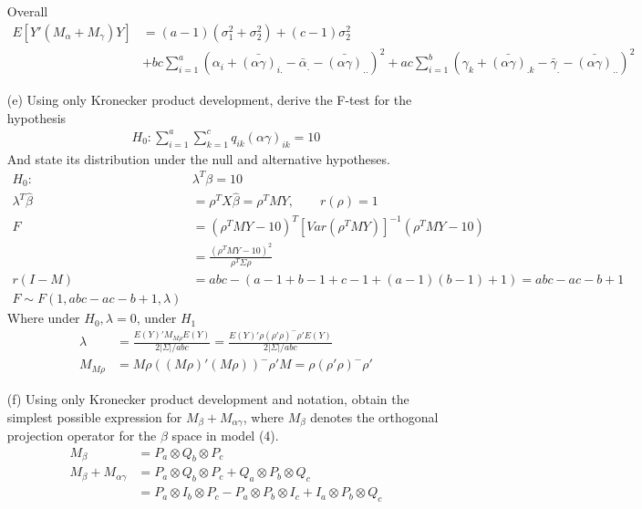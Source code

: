 \begin{itemize}
Overall
\begin{align*}
E[Y'(M_{\alpha} + M_{\gamma})Y] &= (a-1)(\sigma_1^2 + \sigma_2^2) + (c-1) \sigma_2^2\\ 
&+ bc \sum_{i=1}^a (\alpha_i + \bar{(\alpha\gamma)}_{i.} - \bar{\alpha}_{.} - \bar{(\alpha\gamma)}_{..})^2 + ac \sum_{i=1}^b (\gamma_k + \bar{(\alpha\gamma)}_{.k} - \bar{\gamma}_{.} - \bar{(\alpha\gamma)}_{..})^2
\end{align*}
\item[(e)]Using only Kronecker product development, derive the F-test for the hypothesis\\
\begin{align*}
H_0: \sum_{i=1}^a \sum_{k=1}^c q_{ik} (\alpha\gamma)_{ik} = 10
\end{align*}
And state its distribution under the null and alternative hypotheses.\\
\begin{align*}
H_0: & \lambda^T \beta = 10\\
 \lambda^T \hat{\beta} &= \rho^T X \hat{\beta} = \rho^T M Y , \qquad r(\rho) = 1\\
 F &= (\rho^T M Y - 10)^T [Var(\rho^T MY)]^{-1} (\rho^T M Y - 10)\\
 &= \frac{(\rho^T M Y - 10)^2}{\rho^T \Sigma \rho}\\
 r(I-M) &= abc - (a-1 + b-1 + c-1 + (a-1)(b-1) + 1) = abc -ac -b + 1\\
 F \sim F(1, abc -ac -b + 1, \lambda)
\end{align*}
Where under $H_0, \lambda = 0$, under $H_1 $
\begin{align*}
 \lambda &= \frac{E(Y)'M_{M\rho}E(Y)}{2|\Sigma|/abc} = \frac{E(Y)'\rho (\rho'\rho)^{-} \rho' E(Y)}{2|\Sigma|/abc}\\
 M_{M\rho} &= M\rho \left( (M\rho)' (M\rho) \right)^{-} \rho'M = \rho (\rho'\rho)^{-} \rho'
\end{align*}

\item[(f)] Using only Kronecker product development and notation, obtain the simplest possible
expression for $M_{\beta} +M_{\alpha\gamma}$, where $M_{\beta}$ denotes the orthogonal projection operator for the $\beta$ space in model (4).\\
\begin{align*}
M_{\beta} &= P_a \otimes Q_b \otimes P_c\\
M_{\beta} + M_{\alpha\gamma} &= P_a \otimes Q_b \otimes P_c +Q_a \otimes P_b \otimes Q_c\\
&= P_a \otimes I_b \otimes P_c - P_a \otimes P_b \otimes I_c + I_a \otimes P_b \otimes Q_c
\end{align*}


\end{itemize}
